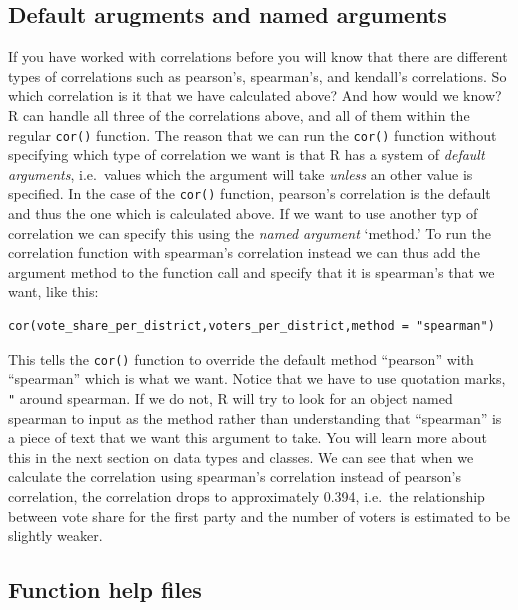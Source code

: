 \documentclass[
]{book}
\begin{document}
\hypertarget{default-arugments-and-named-arguments}{%
\subsection{Default arugments and named arguments}\label{default-arugments-and-named-arguments}}

If you have worked with correlations before you will know that there are different types of correlations such as pearson's, spearman's, and kendall's correlations. So which correlation is it that we have calculated above? And how would we know? R can handle all three of the correlations above, and all of them within the regular \texttt{cor()} function. The reason that we can run the \texttt{cor()} function without specifying which type of correlation we want is that R has a system of \emph{default arguments}, i.e.~values which the argument will take \emph{unless} an other value is specified. In the case of the \texttt{cor()} function, pearson's correlation is the default and thus the one which is calculated above. If we want to use another typ of correlation we can specify this using the \emph{named argument} `method.' To run the correlation function with spearman's correlation instead we can thus add the argument method to the function call and specify that it is spearman's that we want, like this:

\begin{verbatim}
cor(vote_share_per_district,voters_per_district,method = "spearman")
\end{verbatim}

This tells the \texttt{cor()} function to override the default method ``pearson'' with ``spearman'' which is what we want. Notice that we have to use quotation marks, \texttt{"} around spearman. If we do not, R will try to look for an object named spearman to input as the method rather than understanding that ``spearman'' is a piece of text that we want this argument to take. You will learn more about this in the next section on data types and classes. We can see that when we calculate the correlation using spearman's correlation instead of pearson's correlation, the correlation drops to approximately 0.394, i.e.~the relationship between vote share for the first party and the number of voters is estimated to be slightly weaker.

\hypertarget{function-help-files}{%
\subsection{Function help files}\label{function-help-files}}
\end{document}
